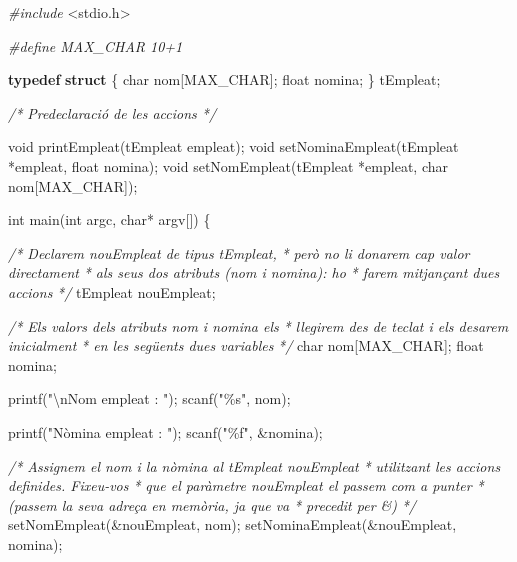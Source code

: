 \documentclass[]{book}
\newenvironment{Shaded}{\begin{snugshade}}{\end{snugshade}}
\newcommand{\CommentTok}[1]{\textcolor[rgb]{0.56,0.35,0.01}{\textit{#1}}}
\newcommand{\DataTypeTok}[1]{\textcolor[rgb]{0.13,0.29,0.53}{#1}}
\newcommand{\ImportTok}[1]{#1}
\newcommand{\KeywordTok}[1]{\textcolor[rgb]{0.13,0.29,0.53}{\textbf{#1}}}
\newcommand{\NormalTok}[1]{#1}
\newcommand{\PreprocessorTok}[1]{\textcolor[rgb]{0.56,0.35,0.01}{\textit{#1}}}
\newcommand{\SpecialCharTok}[1]{\textcolor[rgb]{0.00,0.00,0.00}{#1}}
\newcommand{\StringTok}[1]{\textcolor[rgb]{0.31,0.60,0.02}{#1}}
\begin{document}
\begin{Shaded}
\begin{Highlighting}[]
\PreprocessorTok{\#include }\ImportTok{\textless{}stdio.h\textgreater{}}

\PreprocessorTok{\#define MAX\_CHAR 10+1}

\KeywordTok{typedef} \KeywordTok{struct}\NormalTok{ \{}
    \DataTypeTok{char}\NormalTok{ nom[MAX\_CHAR];}
    \DataTypeTok{float}\NormalTok{ nomina;}
\NormalTok{\} tEmpleat;}

\CommentTok{/* Predeclaració de les accions */}

\DataTypeTok{void}\NormalTok{ printEmpleat(tEmpleat empleat);}
\DataTypeTok{void}\NormalTok{ setNominaEmpleat(tEmpleat *empleat, }\DataTypeTok{float}\NormalTok{ nomina);}
\DataTypeTok{void}\NormalTok{ setNomEmpleat(tEmpleat *empleat, }\DataTypeTok{char}\NormalTok{ nom[MAX\_CHAR]);}

\DataTypeTok{int}\NormalTok{ main(}\DataTypeTok{int}\NormalTok{ argc, }\DataTypeTok{char}\NormalTok{* argv[]) \{}

    \CommentTok{/* Declarem nouEmpleat de tipus tEmpleat,}
\CommentTok{     * però no li donarem cap valor directament}
\CommentTok{     * als seus dos atributs (nom i nomina): ho }
\CommentTok{     * farem mitjançant dues accions }
\CommentTok{     */}
\NormalTok{    tEmpleat nouEmpleat;}
   
    \CommentTok{/* Els valors dels atributs nom i nomina els}
\CommentTok{     * llegirem des de teclat i els desarem inicialment}
\CommentTok{     * en les següents dues variables }
\CommentTok{     */}
    \DataTypeTok{char}\NormalTok{ nom[MAX\_CHAR];}
    \DataTypeTok{float}\NormalTok{ nomina;}
   
\NormalTok{    printf(}\StringTok{"}\SpecialCharTok{\textbackslash{}n}\StringTok{Nom empleat : "}\NormalTok{);}
\NormalTok{    scanf(}\StringTok{"\%s"}\NormalTok{, nom);}
      
\NormalTok{    printf(}\StringTok{"Nòmina empleat : "}\NormalTok{);}
\NormalTok{    scanf(}\StringTok{"\%f"}\NormalTok{, \&nomina);}
   
    \CommentTok{/* Assignem el nom i la nòmina al tEmpleat nouEmpleat}
\CommentTok{     * utilitzant les accions definides. Fixeu{-}vos}
\CommentTok{     * que el paràmetre nouEmpleat el passem com a punter}
\CommentTok{     * (passem la seva adreça en memòria, ja que va }
\CommentTok{     * precedit per \&) }
\CommentTok{     */}
\NormalTok{    setNomEmpleat(\&nouEmpleat, nom);}
\NormalTok{    setNominaEmpleat(\&nouEmpleat, nomina);}
   

\end{Highlighting}
\end{Shaded}
\end{document}
